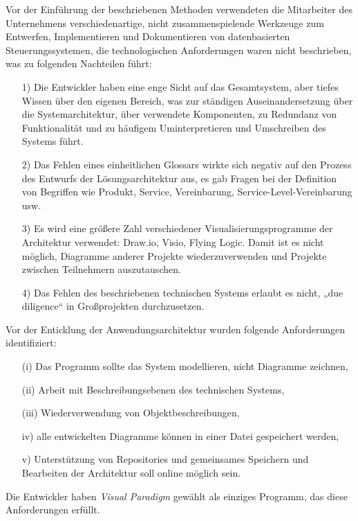 \documentclass[11pt,a4paper]{article}
\begin{document}
Vor der Einführung der beschriebenen Methoden verwendeten die Mitarbeiter des
Unternehmens verschiedenartige, nicht zusammenspielende Werkzeuge zum
Entwerfen, Implementieren und Dokumentieren von datenbasierten
Steuerungssystemen, die technologischen Anforderungen waren nicht beschrieben,
was zu folgenden Nachteilen führt:
\begin{itemize}
\item[1)] Die Entwickler haben eine enge Sicht auf das Gesamtsystem, aber
  tiefes Wissen über den eigenen Bereich, was zur ständigen Auseinandersetzung
  über die Systemarchitektur, über verwendete Komponenten, zu Redundanz von
  Funktionalität und zu häufigem Uminterpretieren und Umschreiben des Systems
  führt. 
\item[2)] Das Fehlen eines einheitlichen Glossars wirkte sich negativ auf den
  Prozess des Entwurfs der Lösungsarchitektur aus, es gab Fragen bei der
  Definition von Begriffen wie Produkt, Service, Vereinbarung,
  Service-Level-Vereinbarung usw.
\item[3)] Es wird eine größere Zahl verschiedener Visualisierungsprogramme der
  Architektur verwendet: Draw.io, Visio, Flying Logic. Damit ist es nicht
  möglich, Diagramme anderer Projekte wiederzuverwenden und Projekte zwischen
  Teilnehmern auszutauschen.
\item[4)] Das Fehlen des beschriebenen technischen Systems erlaubt es nicht,
  „due diligence“ in Großprojekten durchzusetzen.
\end{itemize}
Vor der Enticklung der Anwendungsarchitektur wurden folgende Anforderungen
identifiziert:
\begin{itemize}
\item[(i)] Das Programm sollte das System modellieren, nicht Diagramme
  zeichnen,
\item[(ii)] Arbeit mit Beschreibungsebenen des technischen Systems,
\item[(iii)] Wiederverwendung von Objektbeschreibungen,
\item[iv)] alle entwickelten Diagramme können in einer Datei gespeichert
  werden,
\item[v)] Unterstützung von Repositories und gemeinsames Speichern und
  Bearbeiten der Architektur soll online möglich sein.
\end{itemize}
Die Entwickler haben \emph{Visual Paradigm} gewählt als einziges Programm, das
diese Anforderungen erfüllt.
\end{document}

